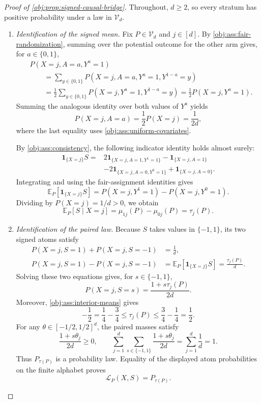 \begin{proof}[Proof of \cref{obj:prop:signed-causal-bridge}]
Throughout, \(d\ge2\), so every stratum has positive probability under a law in \(\mathcal V_d\).

\begin{enumerate}
\item \emph{Identification of the signed mean.}
Fix \(P\in\mathcal V_d\) and \(j\in[d]\). By \cref{obj:ass:fair-randomization}, summing over the potential outcome for the other arm gives, for \(a\in\{0,1\}\),
\[
\begin{aligned}
&P(X=j,A=a,Y^a=1)\\
&\qquad=\sum_{y\in\{0,1\}}
 P(X=j,A=a,Y^a=1,Y^{1-a}=y)\\
&\qquad=\frac12\sum_{y\in\{0,1\}}
 P(X=j,Y^a=1,Y^{1-a}=y)
 =\frac12P(X=j,Y^a=1).
\end{aligned}
\]
Summing the analogous identity over both values of \(Y^a\) yields
\[
P(X=j,A=a)=\frac12P(X=j)=\frac1{2d},
\]
where the last equality uses \cref{obj:ass:uniform-covariates}.

By \cref{obj:ass:consistency}, the following indicator identity holds almost surely:
\[
\begin{aligned}
\mathbf1_{\{X=j\}}S
={}&2\mathbf1_{\{X=j,A=1,Y^1=1\}}
-\mathbf1_{\{X=j,A=1\}}\\
&-2\mathbf1_{\{X=j,A=0,Y^0=1\}}
+\mathbf1_{\{X=j,A=0\}}.
\end{aligned}
\]
Integrating and using the fair-assignment identities gives
\[
\mathbb E_P[\mathbf1_{\{X=j\}}S]
=P(X=j,Y^1=1)-P(X=j,Y^0=1).
\]
Dividing by \(P(X=j)=1/d>0\), we obtain
\[
\mathbb E_P[S\mid X=j]
=\mu_{1j}(P)-\mu_{0j}(P)
=\tau_j(P).
\]

\item \emph{Identification of the paired law.}
Because \(S\) takes values in \(\{-1,1\}\), its two signed atoms satisfy
\[
\begin{aligned}
P(X=j,S=1)+P(X=j,S=-1)&=\frac1d,\\
P(X=j,S=1)-P(X=j,S=-1)
&=\mathbb E_P[\mathbf1_{\{X=j\}}S]
=\frac{\tau_j(P)}d.
\end{aligned}
\]
Solving these two equations gives, for \(s\in\{-1,1\}\),
\[
P(X=j,S=s)=\frac{1+s\tau_j(P)}{2d}.
\]
Moreover, \cref{obj:ass:interior-means} gives
\[
-\frac12
=\frac14-\frac34
\le \tau_j(P)
\le \frac34-\frac14
=\frac12.
\]
For any \(\theta\in[-1/2,1/2]^d\), the paired masses satisfy
\[
\frac{1+s\theta_j}{2d}\ge0,
\qquad
\sum_{j=1}^d\sum_{s\in\{-1,1\}}
\frac{1+s\theta_j}{2d}
=\sum_{j=1}^d\frac1d=1.
\]
Thus \(P_{\tau(P)}\) is a probability law. Equality of the displayed atom probabilities on the finite alphabet proves
\[
\mathcal L_P(X,S)=P_{\tau(P)}.
\]


\end{enumerate}
\end{proof}
